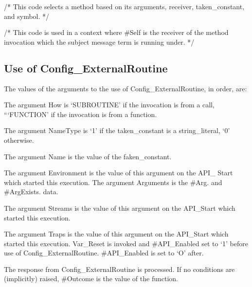 /* This code selects a method based on its arguments, receiver,
taken\_constant, and symbol. */

/* This code is used in a context where \#Self is the receiver of the
method invocation which the subject message term is running under. */


\subsection{Use of
Config\_ExternalRoutine}\label{use-of-config_externalroutine}

The values of the arguments to the use of Config\_ExternalRoutine, in
order, are:

The argument How is `SUBROUTINE' if the invocation is from a call,
```FUNCTION' if the invocation is from a function.

The argument NameType is `1' if the taken\_constant is a
string\_literal, `0' otherwise.

The argument Name is the value of the faken\_constant.

The argument Environment is the value of this argument on the API\_
Start which started this execution. The argument Arguments is the \#Arg.
and \#ArgExists. data.

The argument Streams is the value of this argument on the API\_Start
which started this execution.

The argument Traps is the value of this argument on the API\_Start which
started this execution. Var\_Reset is invoked and \#API\_Enabled set to
`1' before use of Config\_ExternalRoutine. \#API\_Enabled is set to `O'
after.

The response from Config\_ExternalRoutine is processed. If no conditions
are (implicitly) raised, \#Outcome is the value of the function.
